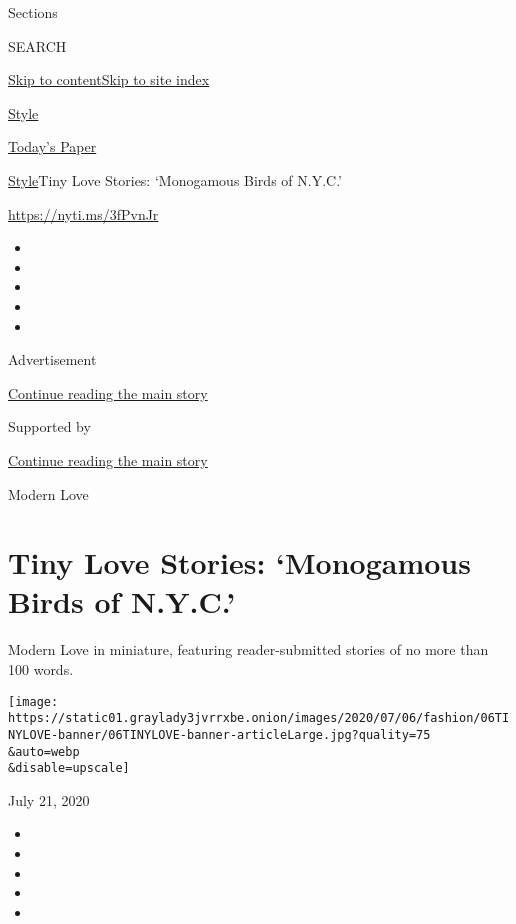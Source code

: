 Sections

SEARCH

\protect\hyperlink{site-content}{Skip to
content}\protect\hyperlink{site-index}{Skip to site index}

\href{https://www.nytimes3xbfgragh.onion/section/style}{Style}

\href{https://myaccount.nytimes3xbfgragh.onion/auth/login?response_type=cookie\&client_id=vi}{}

\href{https://www.nytimes3xbfgragh.onion/section/todayspaper}{Today's
Paper}

\href{/section/style}{Style}\textbar{}Tiny Love Stories: `Monogamous
Birds of N.Y.C.'

\url{https://nyti.ms/3fPvnJr}

\begin{itemize}
\item
\item
\item
\item
\item
\end{itemize}

Advertisement

\protect\hyperlink{after-top}{Continue reading the main story}

Supported by

\protect\hyperlink{after-sponsor}{Continue reading the main story}

Modern Love

\hypertarget{tiny-love-stories-monogamous-birds-of-nyc}{%
\section{Tiny Love Stories: `Monogamous Birds of
N.Y.C.'}\label{tiny-love-stories-monogamous-birds-of-nyc}}

Modern Love in miniature, featuring reader-submitted stories of no more
than 100 words.

\texttt{[image: https://static01.graylady3jvrrxbe.onion/images/2020/07/06/fashion/06TINYLOVE-banner/06TINYLOVE-banner-articleLarge.jpg?quality=75\\\&auto=webp\\\&disable=upscale]}

July 21, 2020

\begin{itemize}
\item
\item
\item
\item
\item
\end{itemize}

